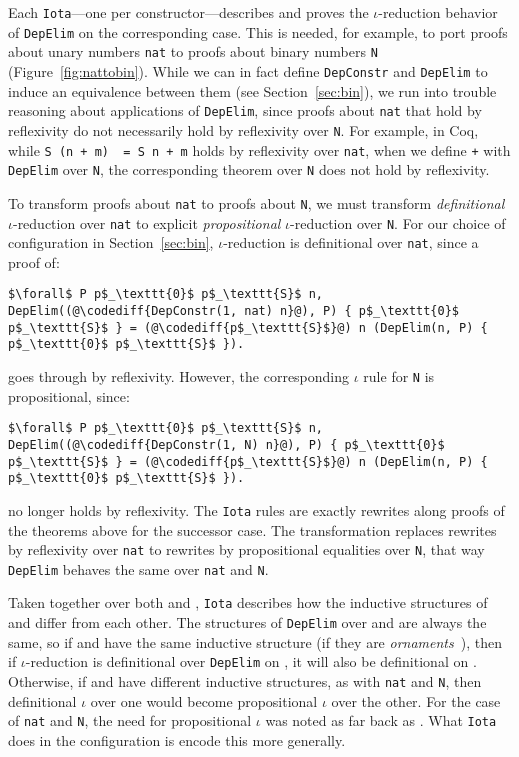 Each \lstinline{Iota}---one per constructor---describes and proves the $\iota$-reduction behavior
of \lstinline{DepElim} on the corresponding case.
This is needed, for example, to port proofs about unary numbers \lstinline{nat} to
proofs about binary numbers \lstinline{N} (Figure~\ref{fig:nattobin}).
While we can in fact define \lstinline{DepConstr} and \lstinline{DepElim} to induce an equivalence
between them (see Section~\ref{sec:bin}), we run into trouble reasoning about applications of \lstinline{DepElim},
since proofs about \lstinline{nat} that hold by reflexivity do not necessarily hold by reflexivity over \lstinline{N}. 
For example, in Coq, while \lstinline{S (n + m)  = S n + m} holds by reflexivity over \lstinline{nat},
when we define \lstinline{+} with \lstinline{DepElim} over \lstinline{N},
the corresponding theorem over \lstinline{N} does not hold by reflexivity.

To transform proofs about \lstinline{nat} to proofs about \lstinline{N}, we must transform \textit{definitional} $\iota$-reduction over \lstinline{nat} to explicit \textit{propositional} $\iota$-reduction over \lstinline{N}.
For our choice of configuration in Section~\ref{sec:bin},
$\iota$-reduction is definitional over \lstinline{nat}, since a proof of:

\begin{lstlisting}
$\forall$ P p$_\texttt{0}$ p$_\texttt{S}$ n, DepElim((@\codediff{DepConstr(1, nat) n}@), P) { p$_\texttt{0}$ p$_\texttt{S}$ } = (@\codediff{p$_\texttt{S}$}@) n (DepElim(n, P) { p$_\texttt{0}$ p$_\texttt{S}$ }).
\end{lstlisting}
goes through by reflexivity.
However, the corresponding $\iota$ rule for \lstinline{N} is propositional, since:

\begin{lstlisting}
$\forall$ P p$_\texttt{0}$ p$_\texttt{S}$ n, DepElim((@\codediff{DepConstr(1, N) n}@), P) { p$_\texttt{0}$ p$_\texttt{S}$ } = (@\codediff{p$_\texttt{S}$}@) n (DepElim(n, P) { p$_\texttt{0}$ p$_\texttt{S}$ }).
\end{lstlisting}
no longer holds by reflexivity.
The \lstinline{Iota} rules are exactly rewrites along proofs of the theorems above for the successor case.
The transformation replaces rewrites by reflexivity over \lstinline{nat} to rewrites by propositional equalities over \lstinline{N},
that way \lstinline{DepElim} behaves the same over \lstinline{nat} and \lstinline{N}.

Taken together over both \A and \B, \lstinline{Iota} describes how the inductive structures of \A and \B differ from each other.
The structures of \lstinline{DepElim} over \A and \B are always the same, so if \A and \B have the same 
inductive structure (if they are \textit{ornaments}~\cite{mcbride}),
then if $\iota$-reduction is definitional over \lstinline{DepElim} on \A, it will also be definitional on \B.
Otherwise, if \A and \B have different inductive structures, as with \lstinline{nat} and \lstinline{N},
then definitional $\iota$ over one would become propositional $\iota$ over the other.
For the case of \lstinline{nat} and \lstinline{N},
the need for propositional $\iota$ was noted as far back as \citet{magaud2000changing}.
What \lstinline{Iota} does in the configuration is encode this more generally.

